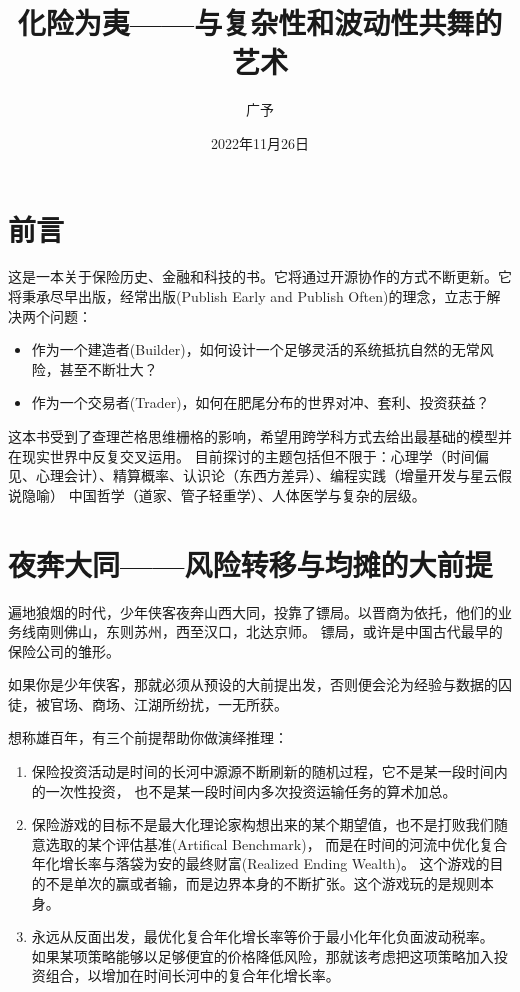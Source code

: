 \documentclass[
  oneside]{book}
\title{化险为夷------与复杂性和波动性共舞的艺术}
\author{广予}
\date{2022年11月26日}
\providecommand{\tightlist}{%
  \setlength{\itemsep}{0pt}\setlength{\parskip}{0pt}}
\begin{document}
\maketitle

{
\setcounter{tocdepth}{1}
\tableofcontents
}
\hypertarget{ux524dux8a00}{%
\chapter*{前言}\label{ux524dux8a00}}

这是一本关于保险历史、金融和科技的书。它将通过开源协作的方式不断更新。它将秉承尽早出版，经常出版(Publish Early and
Publish Often)的理念，立志于解决两个问题：

\begin{itemize}
\tightlist
\item
  作为一个建造者(Builder)，如何设计一个足够灵活的系统抵抗自然的无常风险，甚至不断壮大？
\item
  作为一个交易者(Trader)，如何在肥尾分布的世界对冲、套利、投资获益？
\end{itemize}

这本书受到了查理芒格思维栅格的影响，希望用跨学科方式去给出最基础的模型并在现实世界中反复交叉运用。
目前探讨的主题包括但不限于：心理学（时间偏见、心理会计）、精算概率、认识论（东西方差异）、编程实践（增量开发与星云假说隐喻）
中国哲学（道家、管子轻重学）、人体医学与复杂的层级。

\hypertarget{ux591cux5954ux5927ux540cux98ceux9669ux8f6cux79fbux4e0eux5747ux644aux7684ux5927ux524dux63d0}{%
\chapter{夜奔大同------风险转移与均摊的大前提}\label{ux591cux5954ux5927ux540cux98ceux9669ux8f6cux79fbux4e0eux5747ux644aux7684ux5927ux524dux63d0}}

遍地狼烟的时代，少年侠客夜奔山西大同，投靠了镖局。以晋商为依托，他们的业务线南则佛山，东则苏州，西至汉口，北达京师。
镖局，或许是中国古代最早的保险公司的雏形。

如果你是少年侠客，那就必须从预设的大前提出发，否则便会沦为经验与数据的囚徒，被官场、商场、江湖所纷扰，一无所获。

想称雄百年，有三个前提帮助你做演绎推理：

\begin{enumerate}
\def\labelenumi{\arabic{enumi}.}
\item
  保险投资活动是时间的长河中源源不断刷新的随机过程，它不是某一段时间内的一次性投资，
  也不是某一段时间内多次投资运输任务的算术加总。
\item
  保险游戏的目标不是最大化理论家构想出来的某个期望值，也不是打败我们随意选取的某个评估基准(Artifical Benchmark)，
  而是在时间的河流中优化复合年化增长率与落袋为安的最终财富(Realized Ending Wealth)。
  这个游戏的目的不是单次的赢或者输，而是边界本身的不断扩张。这个游戏玩的是规则本身。
\item
  永远从反面出发，最优化复合年化增长率等价于最小化年化负面波动税率。
  如果某项策略能够以足够便宜的价格降低风险，那就该考虑把这项策略加入投资组合，以增加在时间长河中的复合年化增长率。
\end{enumerate}
\end{document}
